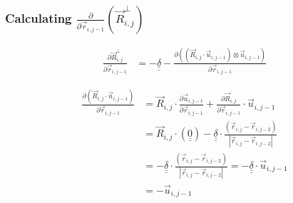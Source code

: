 \documentclass{article}
\renewcommand{\ij}{_{i,j}}
\newcommand{\ijj}{_{i,j-1}}
\newcommand{\ijjj}{_{i,j-2}}
\newcommand{\magn}[1]{\left\vert #1 \right\vert }
\renewcommand{\part}[2]{\frac{\partial #1 }{\partial #2}}
\newcommand{\partbig}[2]{\frac{\partial }{\partial #2}\left( #1 \right)}
\newcommand{\ten}[1]{\underline{\underline{#1}}}
\newcommand{\rij}{\vec{r} \ij}
\newcommand{\Rij}{\vec{R} \ij}
\newcommand{\rijj}{\vec{r} \ijj}
\newcommand{\rijjj}{\vec{r} \ijjj}
\newcommand{\uijj}{\vec{u} \ijj}
\begin{document}


\subsubsection{Calculating $\displaystyle\partbig{\Rij^\perp}{\rijj}$}
\begin{align*}
  \part{\vec{R}\ij ^ \bot}{\vec{r}\ijj}  &= - \ten{\delta} 
  - \part{\left(\left(\vec{R}\ij \cdot \vec{u} \ijj \right) \otimes 
  \vec{u} \ijj \right)
  }{\vec{r}\ijj}
\end{align*}


\begin{align*}
  \part{\left(\vec{R}\ij \cdot \vec{u} \ijj \right)}{\vec{r}\ijj}   
  &= 
  \vec{R}\ij \cdot \part{\vec{u} \ijj}{\vec{r} \ijj} + \part{\vec{R} \ij}{\vec{r} \ijj} \cdot \vec{u}\ijj
  \\
  &= 
  \Rij \cdot \left( \ten{0}
  \right) 
  - \ten{\delta} \cdot \frac{\left( \rij - \rijjj \right)}{\magn{\rij - \rijjj}} 
  \\ 
  &= 
  - \ten{\delta} \cdot \frac{\left( \rij - \rijjj \right)}{\magn{\rij - \rijjj}} 
  =
  - \ten{\delta} \cdot \uijj
  \\
  &
  =
  \boxed{
  - \uijj
  }
\end{align*}
\end{document}
